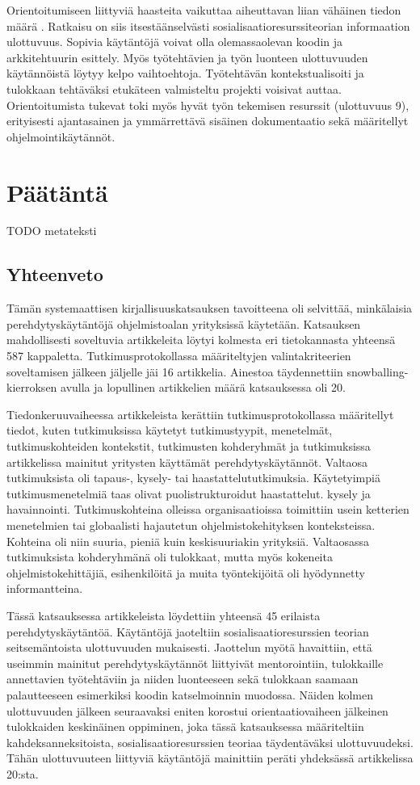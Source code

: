 \documentclass[utf8]{gradu3}
\begin{document}
Orientoitumiseen liittyviä haasteita vaikuttaa aiheuttavan liian vähäinen tiedon määrä \parencite{begel-simon-2008}. Ratkaisu on siis itsestäänselvästi sosialisaatioresurssiteorian informaation ulottuvuus. Sopivia käytäntöjä voivat olla olemassaolevan koodin ja arkkitehtuurin esittely. Myös työtehtävien ja työn luonteen ulottuvuuden käytännöistä löytyy kelpo vaihtoehtoja. Työtehtävän kontekstualisoiti ja tulokkaan tehtäväksi etukäteen valmisteltu projekti voisivat auttaa. Orientoitumista tukevat toki myös hyvät työn tekemisen resurssit (ulottuvuus 9), erityisesti ajantasainen ja ymmärrettävä sisäinen dokumentaatio sekä määritellyt ohjelmointikäytännöt.

\chapter{Päätäntä}

TODO metateksti

\section{Yhteenveto}

Tämän systemaattisen kirjallisuuskatsauksen tavoitteena oli selvittää, minkälaisia perehdytyskäytäntöjä ohjelmistoalan yrityksissä käytetään. Katsauksen mahdollisesti soveltuvia artikkeleita löytyi kolmesta eri tietokannasta yhteensä 587 kappaletta. Tutkimusprotokollassa määriteltyjen valintakriteerien soveltamisen jälkeen jäljelle jäi 16 artikkelia. Ainestoa täydennettiin snowballing-kierroksen avulla ja lopullinen artikkelien määrä katsauksessa oli 20.

Tiedonkeruuvaiheessa artikkeleista kerättiin tutkimusprotokollassa määritellyt tiedot, kuten tutkimuksissa käytetyt tutkimustyypit, menetelmät, tutkimuskohteiden kontekstit, tutkimusten kohderyhmät ja tutkimuksissa artikkelissa mainitut yritysten käyttämät perehdytyskäytännöt. Valtaosa tutkimuksista oli tapaus-, kysely- tai haastattelututkimuksia. Käytetyimpiä tutkimusmenetelmiä taas olivat puolistrukturoidut haastattelut. kysely ja havainnointi. Tutkimuskohteina olleissa organisaatioissa toimittiin usein ketterien menetelmien tai globaalisti hajautetun ohjelmistokehityksen  konteksteissa. Kohteina oli niin suuria, pieniä kuin keskisuuriakin yrityksiä. Valtaosassa tutkimuksista kohderyhmänä oli tulokkaat, mutta myös kokeneita ohjelmistokehittäjiä, esihenkilöitä ja muita työntekijöitä oli hyödynnetty informantteina. 

Tässä katsauksessa artikkeleista löydettiin yhteensä 45 erilaista perehdytyskäytäntöä. Käytäntöjä jaoteltiin sosialisaatioresurssien teorian seitsemäntoista ulottuvuuden mukaisesti. Jaottelun myötä havaittiin, että useimmin mainitut perehdytyskäytännöt liittyivät mentorointiin, tulokkaille annettavien työtehtäviin ja niiden luonteeseen sekä tulokkaan saamaan palautteeseen esimerkiksi koodin katselmoinnin muodossa. Näiden kolmen ulottuvuuden jälkeen seuraavaksi eniten korostui orientaatiovaiheen jälkeinen tulokkaiden keskinäinen oppiminen, joka tässä katsauksessa määriteltiin kahdeksanneksitoista, sosialisaatioresurssien teoriaa täydentäväksi ulottuvuudeksi. Tähän ulottuvuuteen liittyviä käytäntöjä mainittiin peräti yhdeksässä artikkelissa 20:sta.
\end{document}
